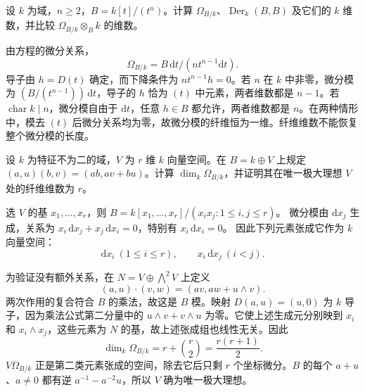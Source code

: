 \begin{exercise}\label{g5:ex:truncated-polynomial-differentials}
	设 \(k\) 为域，\(n\geq2\)，\(B=k[t]/(t^n)\)。计算 \(\Omega_{B/k}\)、\(\operatorname{Der}_k(B,B)\) 及它们的 \(k\) 维数，并比较 \(\Omega_{B/k}\otimes_B k\) 的维数。
\end{exercise}
\begin{solution}
	由方程的微分关系，
	\[
		\Omega_{B/k}=B\,\mathrm{d}t/(nt^{n-1}\mathrm{d}t).
	\]
	导子由 \(h=D(t)\) 确定，而下降条件为 \(nt^{n-1}h=0\)。若 \(n\) 在 \(k\) 中非零，微分模为 \((B/(t^{n-1}))\,\mathrm{d}t\)，导子的 \(h\) 恰为 \((t)\) 中元素，两者维数都是 \(n-1\)。若 \(\operatorname{char}k\mid n\)，微分模自由于 \(\mathrm{d}t\)，任意 \(h\in B\) 都允许，两者维数都是 \(n\)。在两种情形中，模去 \((t)\) 后微分关系均为零，故微分模的纤维恒为一维。纤维维数不能恢复整个微分模的长度。
\end{solution}

\begin{exercise}\label{g5:ex:square-zero-differentials}
	设 \(k\) 为特征不为二的域，\(V\) 为 \(r\) 维 \(k\) 向量空间。在 \(B=k\oplus V\) 上规定
	\((a,u)(b,v)=(ab,av+bu)\)。计算 \(\dim_k\Omega_{B/k}\)，并证明其在唯一极大理想 \(V\) 处的纤维维数为 \(r\)。
\end{exercise}
\begin{solution}
	选 \(V\) 的基 \(x_1,\ldots,x_r\)，则
	\(B=k[x_1,\ldots,x_r]/(x_ix_j:1\leq i,j\leq r)\)。
	微分模由 \(\mathrm{d}x_j\) 生成，关系为
	\(x_i\,\mathrm{d}x_j+x_j\,\mathrm{d}x_i=0\)，特别有 \(x_i\,\mathrm{d}x_i=0\)。
	因此下列元素张成它作为 \(k\) 向量空间：
	\[
		\mathrm{d}x_i\ (1\leq i\leq r),\qquad
		x_i\,\mathrm{d}x_j\ (i<j).
	\]

	为验证没有额外关系，在 \(N=V\oplus\bigwedge^2V\) 上定义
	\[
		(a,u)\cdot(v,w)=(av,aw+u\wedge v).
	\]
	两次作用的复合符合 \(B\) 的乘法，故这是 \(B\) 模。映射
	\(D(a,u)=(u,0)\) 为 \(k\) 导子，因为乘法公式第二分量中的 \(u\wedge v+v\wedge u\) 为零。它使上述生成元分别映到 \(x_i\) 和 \(x_i\wedge x_j\)，这些元素为 \(N\) 的基，故上述张成组也线性无关。因此
	\[
		\dim_k\Omega_{B/k}=r+\binom r2=\frac{r(r+1)}2.
	\]
	\(V\Omega_{B/k}\) 正是第二类元素张成的空间，除去它后只剩 \(r\) 个坐标微分。\(B\) 的每个 \(a+u\)、\(a\ne0\) 都有逆 \(a^{-1}-a^{-2}u\)，所以 \(V\) 确为唯一极大理想。
\end{solution}

